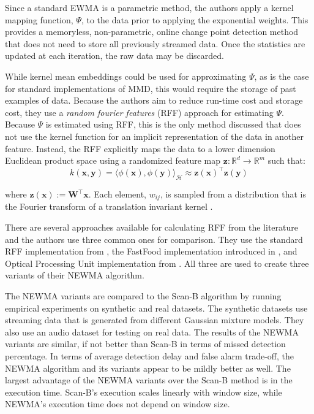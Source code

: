 Since a standard EWMA is a parametric method, the authors apply a kernel mapping function, $\Psi$, to the data prior to applying the exponential weights. This provides a memoryless, non-parametric, online change point detection method that does not need to store all previously streamed data. Once the statistics are updated at each iteration, the raw data may be discarded. %

While kernel mean embeddings could be used for approximating $\Psi$, as is the case for standard implementations of MMD, this would require the storage of past examples of data. Because the authors aim to reduce run-time cost and storage cost, they use a \textit{random fourier features} (RFF) approach for estimating $\Psi$. Because $\Psi$  is estimated using RFF, this is the only method discussed that does not use the kernel function for an implicit representation of the data in another feature. Instead, the RFF explicitly maps the data to a lower dimension Euclidean product space using a randomized feature map $\mathbf{z}: \mathbb{R}^d \rightarrow \mathbb{R}^m$ such that:
\begin{equation}
k(\mathbf{x}, \mathbf{y})=\langle\phi(\mathbf{x}), \phi(\mathbf{y})\rangle_{\mathcal{H}} \approx \mathbf{z}(\mathbf{x})^{\top} \mathbf{z}(\mathbf{y})
\end{equation}

where $\mathbf{z}(\mathbf{x}):=\mathbf{W}^{\top} \mathbf{x}$. Each element, $w_{ij}$, is sampled from a distribution that is the Fourier transform of a translation invariant kernel \cite{rahimi2008random}.

There are several approaches available for calculating RFF from the literature and the authors use three common ones for comparison. They use the standard RFF implementation from \cite{rahimi2008random}, the FastFood implementation introduced in \cite{le2013fastfood}, and Optical Processing Unit implementation from \cite{saade2016random}. All three are used to create three variants of their NEWMA algorithm.

The NEWMA variants are compared to the Scan-B algorithm by running empirical experiments on synthetic and real datasets. The synthetic datasets use streaming data that is generated from different Gaussian mixture models. They also use an audio dataset for testing on real data. The results of the NEWMA variants are similar, if not better than Scan-B in terms of missed detection percentage. In terms of average detection delay and false alarm trade-off, the NEWMA algorithm and its variants appear to be mildly better as well. The largest advantage of the NEWMA variants over the Scan-B method is in the execution time. Scan-B's execution scales linearly with window size, while NEWMA's execution time does not depend on window size.

